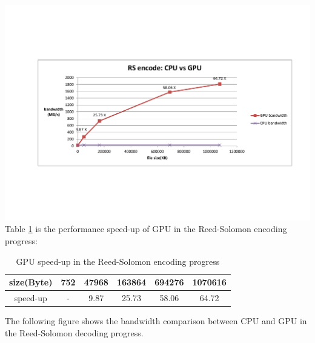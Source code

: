 \documentclass[a4paper]{article}
\begin{document}
\includegraphics[scale=0.48]{result-graph/encode-CPU-vs-GPU-graph.pdf}
Table \ref{encoding-speed-up} is the performance speed-up of GPU in the Reed-Solomon encoding progress:
\begin{table}
\caption{
GPU speed-up in the Reed-Solomon encoding progress
}
\begin{center}
\begin{tabular}{|c|c|c|c|c|c|}
\hline
size(Byte) &  752 & 47968 & 163864 & 694276 & 1070616 \\
\hline
speed-up   &  -   & 9.87  & 25.73  & 58.06  & 64.72 \\
\hline
\end{tabular}
\label{encoding-speed-up}
\end{center}
\end{table}

The following figure shows the bandwidth comparison between CPU and GPU in the Reed-Solomon decoding progress.
\end{document}
